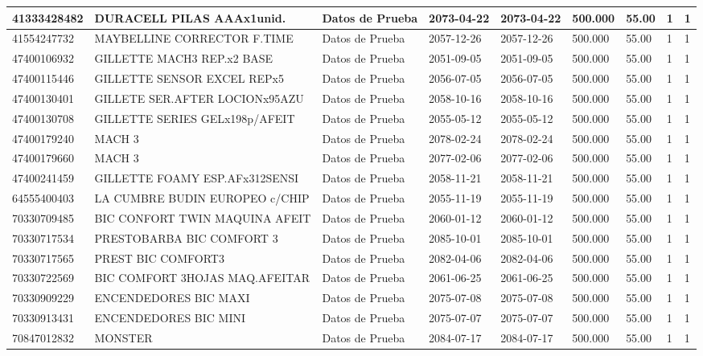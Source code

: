 \documentclass[a4paper,12pt]{article}
\begin{document}
\begin{landscape}
\begin{longtable}{|p{4cm}|p{2.5cm}|p{2.5cm}|p{1.8cm}|p{1.8cm}|p{1cm}|p{1cm}|p{3cm}|p{3cm}||}
41333428482 & DURACELL PILAS AAAx1unid. & Datos de Prueba & 2073-04-22 & 2073-04-22 & 500.000 & 55.00 & 1 & 1 \\ \hline 
41554247732 & MAYBELLINE CORRECTOR F.TIME & Datos de Prueba & 2057-12-26 & 2057-12-26 & 500.000 & 55.00 & 1 & 1 \\ \hline 
47400106932 & GILLETTE MACH3 REP.x2 BASE & Datos de Prueba & 2051-09-05 & 2051-09-05 & 500.000 & 55.00 & 1 & 1 \\ \hline 
47400115446 & GILLETTE SENSOR EXCEL REPx5 & Datos de Prueba & 2056-07-05 & 2056-07-05 & 500.000 & 55.00 & 1 & 1 \\ \hline 
47400130401 & GILLETE SER.AFTER LOCIONx95AZU & Datos de Prueba & 2058-10-16 & 2058-10-16 & 500.000 & 55.00 & 1 & 1 \\ \hline 
47400130708 & GILLETTE SERIES GELx198p/AFEIT & Datos de Prueba & 2055-05-12 & 2055-05-12 & 500.000 & 55.00 & 1 & 1 \\ \hline 
47400179240 & MACH 3 & Datos de Prueba & 2078-02-24 & 2078-02-24 & 500.000 & 55.00 & 1 & 1 \\ \hline 
47400179660 & MACH 3 & Datos de Prueba & 2077-02-06 & 2077-02-06 & 500.000 & 55.00 & 1 & 1 \\ \hline 
47400241459 & GILLETTE FOAMY ESP.AFx312SENSI & Datos de Prueba & 2058-11-21 & 2058-11-21 & 500.000 & 55.00 & 1 & 1 \\ \hline 
64555400403 & LA CUMBRE BUDIN EUROPEO c/CHIP & Datos de Prueba & 2055-11-19 & 2055-11-19 & 500.000 & 55.00 & 1 & 1 \\ \hline 
70330709485 & BIC CONFORT TWIN MAQUINA AFEIT & Datos de Prueba & 2060-01-12 & 2060-01-12 & 500.000 & 55.00 & 1 & 1 \\ \hline 
70330717534 & PRESTOBARBA   BIC  COMFORT  3 & Datos de Prueba & 2085-10-01 & 2085-10-01 & 500.000 & 55.00 & 1 & 1 \\ \hline 
70330717565 & PREST BIC COMFORT3 & Datos de Prueba & 2082-04-06 & 2082-04-06 & 500.000 & 55.00 & 1 & 1 \\ \hline 
70330722569 & BIC COMFORT 3HOJAS MAQ.AFEITAR & Datos de Prueba & 2061-06-25 & 2061-06-25 & 500.000 & 55.00 & 1 & 1 \\ \hline 
70330909229 & ENCENDEDORES BIC MAXI & Datos de Prueba & 2075-07-08 & 2075-07-08 & 500.000 & 55.00 & 1 & 1 \\ \hline 
70330913431 & ENCENDEDORES BIC MINI & Datos de Prueba & 2075-07-07 & 2075-07-07 & 500.000 & 55.00 & 1 & 1 \\ \hline 
70847012832 & MONSTER & Datos de Prueba & 2084-07-17 & 2084-07-17 & 500.000 & 55.00 & 1 & 1 \\ \hline 

\end{longtable}
\end{landscape}
\end{document}
